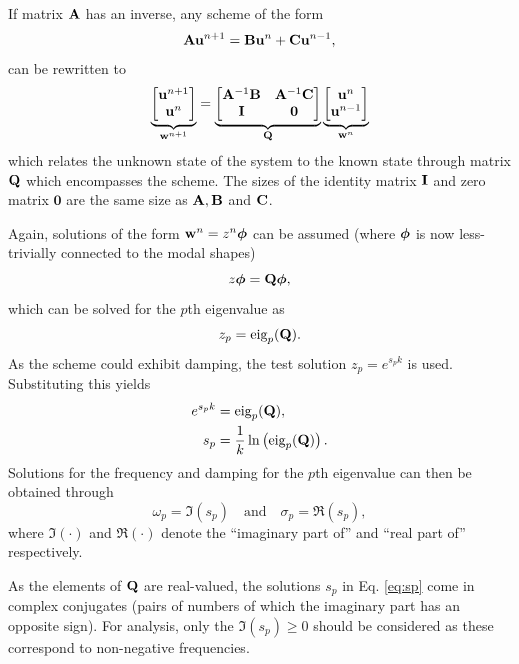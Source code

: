 {{If matrix $\mathbf{A}$ has an inverse, any scheme of the form
\begin{equation}\label{eq:modalForm}
    \mathbf{A}\mathbf{u}^{n+1}=\mathbf{B}\mathbf{u}^n + \mathbf{C}\mathbf{u}^{n-1},
\end{equation}
can be rewritten to
\begin{equation}\label{eq:oneStepForm}
    \underbrace{\begin{bmatrix}
        \mathbf{u}^{n+1}\\
        \mathbf{u}^n
    \end{bmatrix}}_{\mathbf{w}^{n+1}} = 
    \underbrace{\begin{bmatrix}
        \mathbf{A}^{-1}\mathbf{B} & \mathbf{A}^{-1}\mathbf{C}\\
        \mathbf{I} & \mathbf{0}
    \end{bmatrix}}_{\mathbf{Q}}
    \underbrace{\begin{bmatrix}
        \mathbf{u}^n\\
        \mathbf{u}^{n-1}
    \end{bmatrix}}_{\mathbf{w}^n}
\end{equation}
which relates the unknown state of the system to the known state through matrix $\mathbf{Q}$ which encompasses the scheme. The sizes of the identity matrix $\mathbf{I}$ and zero matrix $\mathbf{0}$ are the same size as $\mathbf{A}, \mathbf{B}$ and $\mathbf{C}$.

Again, solutions of the form $\mathbf{w}^n = z^n\boldsymbol{\phi}$ can be assumed (where $\boldsymbol{\phi}$ is now less-trivially connected to the modal shapes)
\begin{equation}
    z\boldsymbol{\phi} = \mathbf{Q}\boldsymbol{\phi} ,
\end{equation}
which can be solved for the $p$th eigenvalue as
\begin{equation}
    z_p = \text{eig}_p(\mathbf{Q}).
\end{equation}
As the scheme could exhibit damping, the test solution $z_p = e^{s_pk}$ is used. Substituting this yields
\begin{align}
    e^{s_pk} &= \text{eig}_p(\mathbf{Q}),\nonumber\\
    s_p &= \frac{1}{k}\ln \left(\text{eig}_p(\mathbf{Q})\right).\label{eq:sp}
\end{align}
Solutions for the frequency and damping for the $p$th eigenvalue can then be obtained through
\begin{equation}
    \omega_p = \mathfrak{I}(s_p) \quad \text{and} \quad \sigma_p = \mathfrak{R}(s_p),
\end{equation}
where $\mathfrak{I}(\cdot)$ and $\mathfrak{R}(\cdot)$ denote the ``imaginary part of'' and ``real part of'' respectively. 

As the elements of $\mathbf{Q}$ are real-valued, the solutions $s_p$ in Eq. \eqref{eq:sp} come in complex conjugates (pairs of numbers of which the imaginary part has an opposite sign). For analysis, only the $\mathfrak{I}(s_p)\geq 0$ should be considered as these correspond to non-negative frequencies. 

}}
